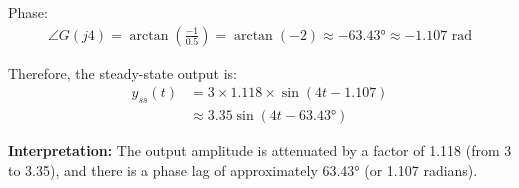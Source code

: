 \documentclass[11pt,a4paper]{article}
\begin{document}
Phase:
\begin{align}
  \angle G(j4) = \arctan\left(\frac{-1}{0.5}\right) = \arctan(-2) \approx -63.43° \approx -1.107 \text{ rad}
\end{align}

Therefore, the steady-state output is:
\begin{align}
  y_{ss}(t) &= 3 \times 1.118 \times \sin(4t - 1.107) \\
  &\approx 3.35\sin(4t - 63.43°)
\end{align}

\textbf{Interpretation:} The output amplitude is attenuated by a factor of 1.118 (from 3 to 3.35), and there is a phase lag of approximately 63.43° (or 1.107 radians).
\end{document}
